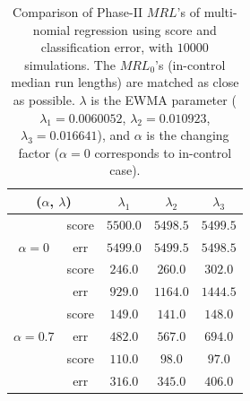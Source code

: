 \documentclass[twoside,11pt]{article}
\begin{document}
\begin{table}[!t]
\centering
\begin{tabular}{ccccc}
\toprule
\multicolumn{2}{c}{($ \alpha$, $ \lambda$)} & $ \lambda_1$ & $ \lambda_2$ & $ \lambda_3$ \\
\midrule
\multirow{3}{*}{$\alpha=0$} & score &$5500.0$ & $5498.5$ & $5499.5$ \\
& err &$5499.0$ & $5499.5$ & $5498.5$ \\
\midrule
\multirow{3}{*}{$\alpha=0.5$} & score &$\bm{246.0}$ & $\bm{260.0}$ & $\bm{302.0}$ \\
& err &$929.0$ & $1164.0$ & $1444.5$ \\
\midrule
\multirow{3}{*}{$\alpha=0.7$} & score &$\bm{149.0}$ & $\bm{141.0}$ & $\bm{148.0}$ \\
& err &$482.0$ & $567.0$ & $694.0$ \\
\midrule
\multirow{3}{*}{$\alpha=0.9$} & score &$\bm{110.0}$ & $\bm{98.0}$ & $\bm{97.0}$ \\
& err &$316.0$ & $345.0$ & $406.0$ \\
\midrule
\end{tabular}
\caption{Comparison of Phase-II $MRL$'s of multi-nomial regression using score and classification error, with $10000$ simulations. The $MRL_0$'s (in-control median run lengths) are matched as close as possible. $ \lambda$ is the EWMA parameter ({$ \lambda_1 = 0.0060052$}, {$ \lambda_2 = 0.010923$}, {$ \lambda_3 = 0.016641$}), and $ \alpha$ is the changing factor ($ \alpha=0$ corresponds to in-control case).}
\label{tab:multi_logi_MRL}
\end{table}
\end{document}
